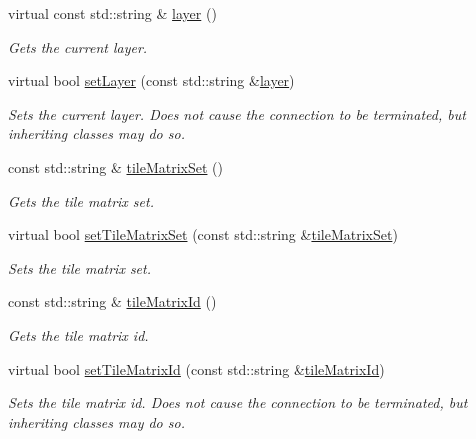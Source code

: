 \begin{DoxyCompactItemize}
virtual const std\+::string \& \hyperlink{group___imagery_module_gafe3e2d18fb0c9ef72b3c23e97ead241f}{layer} ()
\begin{DoxyCompactList}\small\item\em Gets the current layer. \end{DoxyCompactList}\item 
virtual bool \hyperlink{group___imagery_module_ga509f0f787565fafc1618cc0e5fb2399a}{set\+Layer} (const std\+::string \&\hyperlink{group___imagery_module_gafe3e2d18fb0c9ef72b3c23e97ead241f}{layer})
\begin{DoxyCompactList}\small\item\em Sets the current layer. Does not cause the connection to be terminated, but inheriting classes may do so. \end{DoxyCompactList}\item 
const std\+::string \& \hyperlink{group___imagery_module_gae380a970bc0aa63d34e6f2295ea9c8f4}{tile\+Matrix\+Set} ()
\begin{DoxyCompactList}\small\item\em Gets the tile matrix set. \end{DoxyCompactList}\item 
virtual bool \hyperlink{group___imagery_module_ga56c3ba986ce399f2fc6a1d9dcf886b49}{set\+Tile\+Matrix\+Set} (const std\+::string \&\hyperlink{group___imagery_module_gae380a970bc0aa63d34e6f2295ea9c8f4}{tile\+Matrix\+Set})
\begin{DoxyCompactList}\small\item\em Sets the tile matrix set. \end{DoxyCompactList}\item 
const std\+::string \& \hyperlink{group___imagery_module_gae6a1721e1da9ab60ab4e62240baf304b}{tile\+Matrix\+Id} ()
\begin{DoxyCompactList}\small\item\em Gets the tile matrix id. \end{DoxyCompactList}\item 
virtual bool \hyperlink{group___imagery_module_ga5f85c6b91d45f419905321b3752aa70c}{set\+Tile\+Matrix\+Id} (const std\+::string \&\hyperlink{group___imagery_module_gae6a1721e1da9ab60ab4e62240baf304b}{tile\+Matrix\+Id})
\begin{DoxyCompactList}\small\item\em Sets the tile matrix id. Does not cause the connection to be terminated, but inheriting classes may do so. \end{DoxyCompactList}\item 

\end{DoxyCompactItemize}
